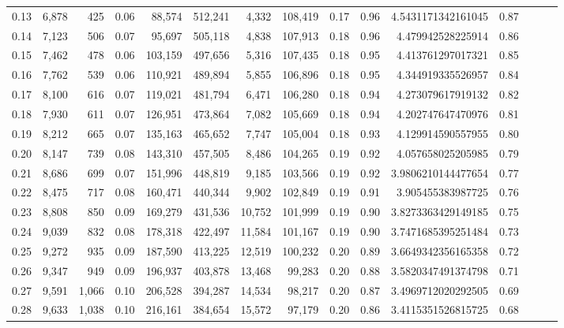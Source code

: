 \begin{tabular}{rrrrrrrrrrrrrrr}
0.13 &   6,878 &    425 &  0.06 &   88,574 &  512,241 &    4,332 &  108,419 &  0.17 &  0.96 &    4.5431171342161045 &      0.87 \\
0.14 &   7,123 &    506 &  0.07 &   95,697 &  505,118 &    4,838 &  107,913 &  0.18 &  0.96 &     4.479942528225914 &      0.86 \\
0.15 &   7,462 &    478 &  0.06 &  103,159 &  497,656 &    5,316 &  107,435 &  0.18 &  0.95 &     4.413761297017321 &      0.85 \\
0.16 &   7,762 &    539 &  0.06 &  110,921 &  489,894 &    5,855 &  106,896 &  0.18 &  0.95 &     4.344919335526957 &      0.84 \\
0.17 &   8,100 &    616 &  0.07 &  119,021 &  481,794 &    6,471 &  106,280 &  0.18 &  0.94 &     4.273079617919132 &      0.82 \\
0.18 &   7,930 &    611 &  0.07 &  126,951 &  473,864 &    7,082 &  105,669 &  0.18 &  0.94 &     4.202747647470976 &      0.81 \\
0.19 &   8,212 &    665 &  0.07 &  135,163 &  465,652 &    7,747 &  105,004 &  0.18 &  0.93 &     4.129914590557955 &      0.80 \\
0.20 &   8,147 &    739 &  0.08 &  143,310 &  457,505 &    8,486 &  104,265 &  0.19 &  0.92 &     4.057658025205985 &      0.79 \\
0.21 &   8,686 &    699 &  0.07 &  151,996 &  448,819 &    9,185 &  103,566 &  0.19 &  0.92 &    3.9806210144477654 &      0.77 \\
0.22 &   8,475 &    717 &  0.08 &  160,471 &  440,344 &    9,902 &  102,849 &  0.19 &  0.91 &     3.905455383987725 &      0.76 \\
0.23 &   8,808 &    850 &  0.09 &  169,279 &  431,536 &   10,752 &  101,999 &  0.19 &  0.90 &    3.8273363429149185 &      0.75 \\
0.24 &   9,039 &    832 &  0.08 &  178,318 &  422,497 &   11,584 &  101,167 &  0.19 &  0.90 &    3.7471685395251484 &      0.73 \\
0.25 &   9,272 &    935 &  0.09 &  187,590 &  413,225 &   12,519 &  100,232 &  0.20 &  0.89 &    3.6649342356165358 &      0.72 \\
0.26 &   9,347 &    949 &  0.09 &  196,937 &  403,878 &   13,468 &   99,283 &  0.20 &  0.88 &    3.5820347491374798 &      0.71 \\
0.27 &   9,591 &  1,066 &  0.10 &  206,528 &  394,287 &   14,534 &   98,217 &  0.20 &  0.87 &    3.4969712020292505 &      0.69 \\
0.28 &   9,633 &  1,038 &  0.10 &  216,161 &  384,654 &   15,572 &   97,179 &  0.20 &  0.86 &    3.4115351526815725 &      0.68 \\

\end{tabular}
